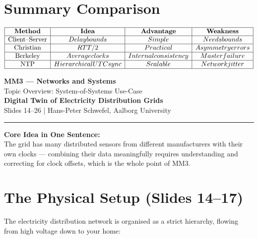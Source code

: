 \section{Summary Comparison}

\[
\begin{array}{|c|c|c|c|}
\hline
\textbf{Method} & \textbf{Idea} & \textbf{Advantage} & \textbf{Weakness} \\
\hline
\text{Client--Server} & Delay bounds & Simple & Needs bounds \\
\hline
\text{Christian} & RTT / 2 & Practical & Asymmetry errors \\
\hline
\text{Berkeley} & Average clocks & Internal consistency & Master failure \\
\hline
\text{NTP} & Hierarchical UTC sync & Scalable & Network jitter \\
\hline
\end{array}
\]
\clearpage
\begin{center}
  {\LARGE\bfseries\color{aaublue}
    MM3 --- Networks and Systems}\\[0.4em]
  {\large\color{accentgray}
    Topic Overview: System-of-Systems Use-Case}\\[0.2em]
  {\large\bfseries
    Digital Twin of Electricity Distribution Grids}\\[0.3em]
  {\small\color{accentgray} Slides 14--26 \quad|\quad
    Hans-Peter Schwefel, Aalborg University}
\end{center}
 
\vspace{0.5em}\hrule\vspace{1em}
 
\begin{summarybox}
\textbf{Core Idea in One Sentence:}\\
The grid has many distributed sensors from different manufacturers
with their own clocks --- combining their data meaningfully requires
understanding and correcting for clock offsets, which is the whole
point of MM3.
\end{summarybox}
 
\section{The Physical Setup (Slides 14--17)}
 
The electricity distribution network is organised as a strict
hierarchy, flowing from high voltage down to your home:
 
